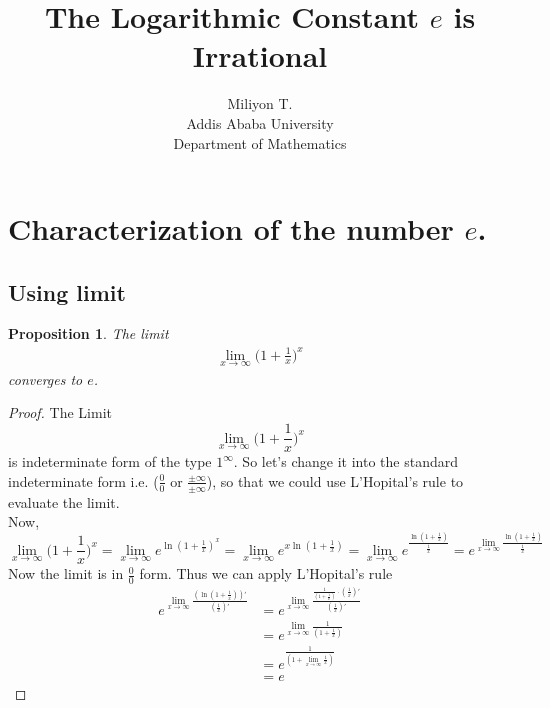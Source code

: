 \documentclass[12pt]{article}
\newtheorem{prop}[thm]{Proposition}
\newcommand{\ds}{\displaystyle}      %
\begin{document}
\nocite{}

\title{\textbf{The Logarithmic Constant $e$ is  Irrational}}

\author{Miliyon T.\\Addis Ababa University\\ Department of Mathematics}
\maketitle

\section{Characterization of the number $e$.}

\subsection{Using limit}

\begin{prop} The limit
\begin{align}
\lim_{x\rightarrow \infty}\biggl(1+\frac{1}{x}\biggl)^x
\end{align}
converges to $e$.
\end{prop}
\begin{proof} The Limit
\[\lim_{x\rightarrow \infty}\biggl(1+\frac{1}{x}\biggl)^x\]
is indeterminate form of the type $1^{\infty}$. So let's change it into the standard indeterminate form i.e. ($\frac{0}{0}$ or $\frac{\pm \infty}{\pm\infty}$), so that we could use L'Hopital's rule to evaluate the limit. \\
Now,
\[\lim_{x\rightarrow \infty}\biggl(1+\frac{1}{x}\biggl)^x=\lim_{x\rightarrow\infty} e^{\ln(1+\frac{1}{x})^x} = \lim_{x\rightarrow \infty} e^{x \ln(1+\frac{1}{x})}=\lim_{x\rightarrow \infty} e^{\frac{\ln(1+\frac{1}{x})}{\frac{1}{x}}}=e^{\ds\lim_{x\rightarrow\infty}\frac{\ln ⁡(1+\frac{1}{x})}{\frac{1}{x}}}\]
Now the limit is in  $\frac{0}{0}$  form. Thus we can apply L'Hopital's rule
\begin{align*}e^{\ds\lim_{x\rightarrow\infty}\frac{(\ln ⁡(1+\frac{1}{x}))'}{(\frac{1}{x})'}}
&= e^{\ds\lim_{x\rightarrow\infty}\frac{⁡\frac{1}{(1+\frac{1}{x})}\cdot(\frac{1}{x})'}{(\frac{1}{x})'}}\\
&=e^{\ds\lim_{x\rightarrow\infty}\frac{1}{(1+\frac{1}{x})}}\\
&=e^{\ds\frac{1}{\left(1+\ds\lim_{x\rightarrow\infty}\frac{1}{x}\right)}}\\
&=e
\end{align*}
\end{proof}
\end{document}

